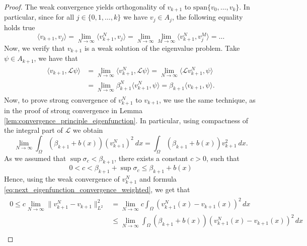 \documentclass[11pt, a4paper]{article}
\theoremstyle{break}
\theoremstyle{break}
\theoremstyle{break}
\theoremstyle{break}
\theoremstyle{break}
\theoremstyle{break}
\theoremstyle{break}
\theoremstyle{break}
\theoremstyle{break}
\begin{document}
\begin{proof}
    The weak convergence yields orthogonality of $v_{k+1}$ to $\text{span}\{v_0, \ldots, v_{k}\}$. In particular, since for all $j \in \{0, 1, \ldots, k\}$ we have $v_j \in A_j$, the following equality holds true
    \begin{equation}
        \langle v_{k+1} , v_j \rangle = \lim_{N \rightarrow \infty} \langle v_{k+1}^N, v_j \rangle = \lim_{N \rightarrow \infty} \lim_{M \rightarrow \infty} \langle v_{k+1}^N, v_j^M \rangle = \ldots
    \end{equation}
    Now, we verify that $v_{k+1}$ is a weak solution of the eigenvalue problem. Take $\psi \in A_{k+1}$, we have that
    \begin{align}
        \begin{split}
            \langle v_{k+1}, \mathcal{L} \psi \rangle
            &= \lim_{N \to \infty} \langle v_{k+1}^N, \mathcal{L} \psi \rangle = \lim_{N \to \infty} \langle \mathcal{L} v_{k+1}^N, \psi \rangle \\
            &= \lim_{N \to \infty} \beta_{k+1}^N \langle v_{k+1}^N, \psi \rangle = \beta_{k+1} \langle v_{k+1}, \psi \rangle.
        \end{split}
    \end{align}
    Now, to prove strong convergence of $v_{k+1}^N$ to $v_{k+1}$, we use the same technique, as in the proof of strong convergence in Lemma \ref{lem:convergence_principle_eigenfunction}. In particular, using compactness of the integral part of $\mathcal{L}$ we obtain
    \begin{equation}
        \label{eq:next_eigenfunction_convergence_weighted}
        \lim_{N \rightarrow \infty} \int_\Omega (\beta_{k+1} + b(x)) (v_{k+1}^N)^2\:dx = \int_\Omega (\beta_{k+1} + b(x))v_{k+1}^2\:dx.
    \end{equation}
    As we assumed that $\sup \sigma_c < \beta_{k+1}$, there exists a constant $c > 0$, such that 
    \begin{equation}
        0 < c < \beta_{k+1} + \sup \sigma_c \leq \beta_{k+1} + b(x)
    \end{equation}
    Hence, using the weak convergence of $v_{k+1}^N$ and formula \eqref{eq:next_eigenfunction_convergence_weighted}, we get that
    \begin{align}
        \begin{split}
            0 \leq c \lim_{N\rightarrow \infty}\|v_{k+1}^N - v_{k+1}\|_{L^2}^2 
            &= \lim_{N\rightarrow \infty} c \int_\Omega (v_{k+1}^N(x) - v_{k+1}(x))^2 \, dx \nonumber \\
            &\leq \lim_{N\rightarrow \infty} \int_\Omega (\beta_{k+1} + b(x))(v_{k+1}^N(x) - v_{k+1}(x))^2 \, dx \nonumber \\

\end{split}
\end{align}
\end{proof}
\end{document}
